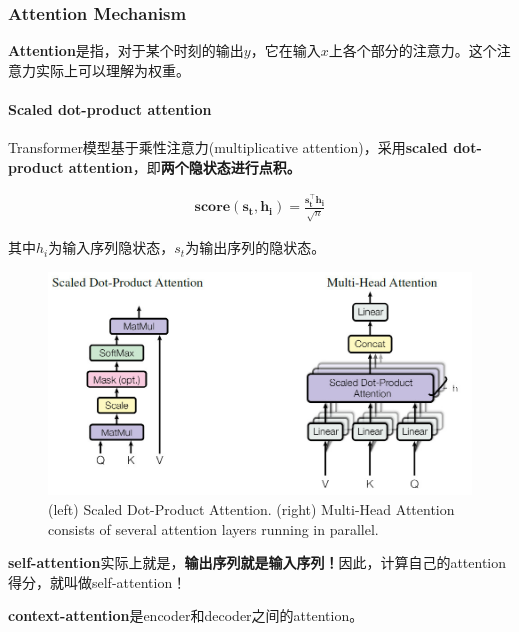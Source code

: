 \documentclass[letterpaper,10pt]{article}
\begin{document}
	\subsubsection{Attention Mechanism}
	
	\textbf{Attention}是指，对于某个时刻的输出$y$，它在输入$x$上各个部分的注意力。这个注意力实际上可以理解为权重。
	
	\paragraph{Scaled dot-product attention}
	
	Transformer模型基于乘性注意力(multiplicative attention)，采用\textbf{scaled dot-product attention}，即\textbf{两个隐状态进行点积。}
	
	\begin{equation}
		\begin{aligned}
			\textbf{score}(\mathbf{s_t},\mathbf{h_i})=\frac{\mathbf{s_t^\top h_i}}{\sqrt{n}}
		\end{aligned}
		\label{eq: multiplicative attention}
	\end{equation}
	
	其中$h_i$为输入序列隐状态，$s_t$为输出序列的隐状态。
	
	\begin{figure}[htbp]
		\centering 
		\includegraphics[width=0.8\columnwidth]{picture/Transfromer_attention}
		\captionsetup{font=scriptsize}
		\caption{
			\label{fig: Transformer_attention} (left) Scaled Dot-Product Attention. (right) Multi-Head Attention consists of several attention layers running in parallel.
		}
	\end{figure}
	
	\textbf{self-attention}实际上就是，\textbf{输出序列就是输入序列！}因此，计算自己的attention得分，就叫做self-attention！
	
	\textbf{context-attention}是encoder和decoder之间的attention。
	
\end{document}
